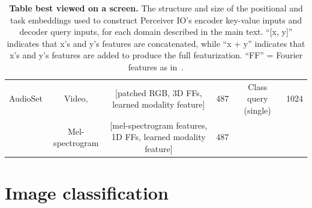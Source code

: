 \documentclass{article} %
\newcommand{\ourmodel}{Perceiver IO\xspace}
\begin{document}
\begin{table}[h]
{\begin{tabular}{c  c  c  c  c  c}
AudioSet & Video, & [patched RGB, 3D FFs, learned modality feature] & 487 & Class query (single) & 1024 \\
 & Mel-spectrogram & [mel-spectrogram features, 1D FFs, learned modality feature] & 487 &  &  \\
 \bottomrule
\end{tabular}}
\vspace{1mm}
\caption{\small \label{tab:pos_encodings_queries} \textbf{Table best viewed on a screen.} The structure and size of the positional and task embeddings used to construct \ourmodel{}'s encoder key-value inputs and decoder query inputs, for each domain described in the main text. ``[x, y]'' indicates that x's and y's features are concatenated, while ``x + y'' indicates that x's and y's features are added to produce the full featurization. ``FF'' = Fourier features as in~\cite{jaegle2021perceiver}.}
\end{table}

\section{Image classification}
\label{sec:imagenet}
\end{document}
